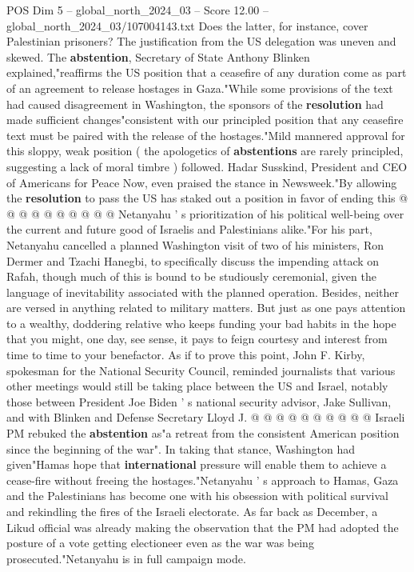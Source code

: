 \begin{textsample}{POS Dim 5 – global\_north\_2024\_03 – Score 12.00 – global\_north\_2024\_03/107004143.txt}
Does the latter, for instance, cover Palestinian prisoners?
The justification from the US delegation was uneven and skewed.
The \textbf{abstention}, Secretary of State Anthony Blinken explained,"reaffirms the US position that a ceasefire of any duration come as part of an agreement to release hostages in Gaza."While some provisions of the text had caused disagreement in Washington, the sponsors of the \textbf{resolution} had made sufficient changes"consistent with our principled position that any ceasefire text must be paired with the release of the hostages."Mild mannered approval for this sloppy, weak position ( the apologetics of \textbf{abstentions} are rarely principled, suggesting a lack of moral timbre ) followed.
Hadar Susskind, President and CEO of Americans for Peace Now, even praised the stance in Newsweek."By allowing the \textbf{resolution} to pass the US has staked out a position in favor of ending this @ @ @ @ @ @ @ @ @ @ Netanyahu ' s prioritization of his political well-being over the current and future good of Israelis and Palestinians alike."For his part, Netanyahu cancelled a planned Washington visit of two of his ministers, Ron Dermer and Tzachi Hanegbi, to specifically discuss the impending attack on Rafah, though much of this is bound to be studiously ceremonial, given the language of inevitability associated with the planned operation.
Besides, neither are versed in anything related to military matters.
But just as one pays attention to a wealthy, doddering relative who keeps funding your bad habits in the hope that you might, one day, see sense, it pays to feign courtesy and interest from time to time to your benefactor.
As if to prove this point, John F.
Kirby, spokesman for the National Security Council, reminded journalists that various other meetings would still be taking place between the US and Israel, notably those between President Joe Biden ' s national security advisor, Jake Sullivan, and with Blinken and Defense Secretary Lloyd J. @ @ @ @ @ @ @ @ @ @ Israeli PM rebuked the \textbf{abstention} as"a retreat from the consistent American position since the beginning of the war".
In taking that stance, Washington had given"Hamas hope that \textbf{international} pressure will enable them to achieve a cease-fire without freeing the hostages."Netanyahu ' s approach to Hamas, Gaza and the Palestinians has become one with his obsession with political survival and rekindling the fires of the Israeli electorate.
As far back as December, a Likud official was already making the observation that the PM had adopted the posture of a vote getting electioneer even as the war was being prosecuted."Netanyahu is in full campaign mode.

\end{textsample}
